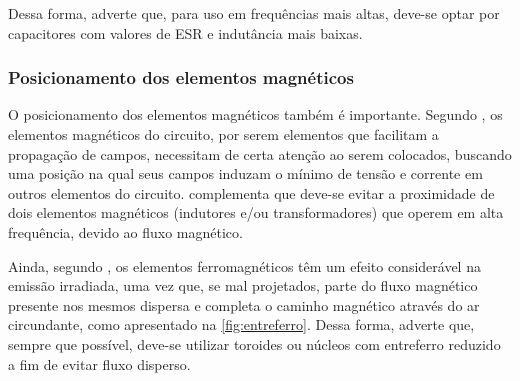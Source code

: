             Dessa forma,  adverte que, para uso em frequências mais altas, deve-se optar por capacitores com valores de ESR e indutância mais baixas.
            
            \subsubsection{Posicionamento dos elementos magnéticos} \label{cap:fund_emc_conv_mitig_magn}
            
            O posicionamento dos elementos magnéticos também é importante. Segundo , os elementos magnéticos do circuito, por serem elementos que facilitam a propagação de campos, necessitam de certa atenção ao serem colocados, buscando uma posição na qual seus campos induzam o mínimo de tensão e corrente em outros elementos do circuito.  complementa que deve-se evitar a proximidade de dois elementos magnéticos (indutores e/ou transformadores) que operem em alta frequência, devido ao fluxo magnético. 
            
            Ainda, segundo , os elementos ferromagnéticos têm um efeito considerável na emissão irradiada, uma vez que, se mal projetados, parte do fluxo magnético presente nos mesmos dispersa e completa o caminho magnético através do ar circundante, como apresentado na \autoref{fig:entreferro}.
            Dessa forma,  adverte que, sempre que possível, deve-se utilizar toroides ou núcleos com entreferro reduzido a fim de evitar fluxo disperso. 
            
